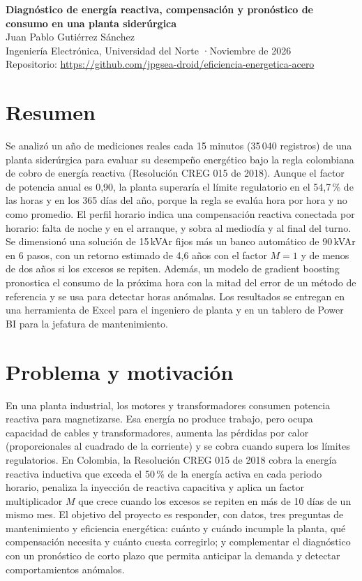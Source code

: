\documentclass[11pt,a4paper]{article}
\begin{document}
\begin{center}
{\LARGE\bfseries\color{acento} Diagnóstico de energía reactiva, compensación y pronóstico de consumo en una planta siderúrgica}\\[0.6em]
{\large Juan Pablo Gutiérrez Sánchez}\\[0.2em]
Ingeniería Electrónica, Universidad del Norte \quad·\quad Noviembre de 2026\\[0.2em]
\small Repositorio: \url{https://github.com/jpgsea-droid/eficiencia-energetica-acero}
\end{center}

\section*{Resumen}
Se analizó un año de mediciones reales cada 15 minutos (35\,040 registros) de una planta siderúrgica para evaluar su desempeño energético bajo la regla colombiana de cobro de energía reactiva (Resolución CREG 015 de 2018). Aunque el factor de potencia anual es 0,90, la planta superaría el límite regulatorio en el 54,7\,\% de las horas y en los 365 días del año, porque la regla se evalúa hora por hora y no como promedio. El perfil horario indica una compensación reactiva conectada por horario: falta de noche y en el arranque, y sobra al mediodía y al final del turno. Se dimensionó una solución de 15\,kVAr fijos más un banco automático de 90\,kVAr en 6 pasos, con un retorno estimado de 4,6 años con el factor $M=1$ y de menos de dos años si los excesos se repiten. Además, un modelo de gradient boosting pronostica el consumo de la próxima hora con la mitad del error de un método de referencia y se usa para detectar horas anómalas. Los resultados se entregan en una herramienta de Excel para el ingeniero de planta y en un tablero de Power BI para la jefatura de mantenimiento.

\section{Problema y motivación}
En una planta industrial, los motores y transformadores consumen potencia reactiva para magnetizarse. Esa energía no produce trabajo, pero ocupa capacidad de cables y transformadores, aumenta las pérdidas por calor (proporcionales al cuadrado de la corriente) y se cobra cuando supera los límites regulatorios. En Colombia, la Resolución CREG 015 de 2018 cobra la energía reactiva inductiva que exceda el 50\,\% de la energía activa en cada periodo horario, penaliza la inyección de reactiva capacitiva y aplica un factor multiplicador $M$ que crece cuando los excesos se repiten en más de 10 días de un mismo mes. El objetivo del proyecto es responder, con datos, tres preguntas de mantenimiento y eficiencia energética: cuánto y cuándo incumple la planta, qué compensación necesita y cuánto cuesta corregirlo; y complementar el diagnóstico con un pronóstico de corto plazo que permita anticipar la demanda y detectar comportamientos anómalos.
\end{document}
